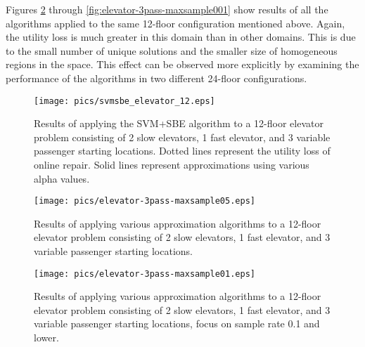 Figures \ref{fig:elevator-3pass-maxsample05} through \ref{fig:elevator-3pass-maxsample001} show results of all the algorithms applied to the same 12-floor configuration mentioned above.  Again, the utility loss is much greater in this domain than in other domains.  This is due to the small number of unique solutions and the smaller size of homogeneous regions in the space.  This effect can be observed more explicitly by examining the performance of the algorithms in two different 24-floor configurations.  


\begin{figure}
\begin{center}
\texttt{[image: pics/svmsbe\_elevator\_12.eps]}
\caption{Results of applying the SVM+SBE algorithm to a 12-floor elevator problem consisting of 2 slow elevators, 1 fast elevator, and 3 variable passenger starting locations.  Dotted lines represent the utility loss of online repair.  Solid lines represent approximations using various alpha values.}
\label{fig:svmsbe_elevator_12}
\end{center}
\end{figure}




\begin{figure}
\begin{center}
\texttt{[image: pics/elevator-3pass-maxsample05.eps]}
\caption{Results of applying various approximation algorithms to a 12-floor elevator problem consisting of 2 slow elevators, 1 fast elevator, and 3 variable passenger starting locations.}
\label{fig:elevator-3pass-maxsample05}
\end{center}
\end{figure}

\begin{figure}
\begin{center}
\texttt{[image: pics/elevator-3pass-maxsample01.eps]}
\caption{Results of applying various approximation algorithms to a 12-floor elevator problem consisting of 2 slow elevators, 1 fast elevator, and 3 variable passenger starting locations, focus on sample rate 0.1 and lower.}
\label{fig:elevator-3pass-maxsample01}
\end{center}
\end{figure}

